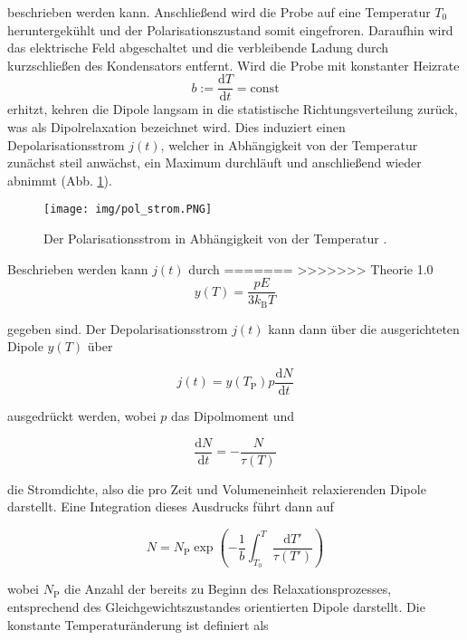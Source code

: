 beschrieben werden kann.
Anschließend wird die Probe auf eine Temperatur $T_0$ heruntergekühlt und der Polarisationszustand somit eingefroren.
Daraufhin wird das elektrische Feld abgeschaltet und die verbleibende Ladung durch kurzschließen des Kondensators entfernt.
Wird die Probe mit konstanter Heizrate
\begin{equation}
    b := \frac{\mathrm{d}T}{\mathrm{d}t} = \text{const}
\end{equation}
erhitzt, kehren die Dipole langsam in die statistische Richtungsverteilung zurück, was als Dipolrelaxation bezeichnet wird.
Dies induziert einen Depolarisationsstrom $j(t)$, welcher in Abhängigkeit von der Temperatur zunächst steil anwächst, ein Maximum durchläuft und anschließend wieder abnimmt (Abb. \ref{fig:pol_strom}).
\begin{figure}
    \centering
    \texttt{[image: img/pol\_strom.PNG]}
    \caption{Der Polarisationsstrom in Abhängigkeit von der Temperatur \cite{V48}.}
    \label{fig:pol_strom}
\end{figure}
Beschrieben werden kann $j(t)$ durch
=======
>>>>>>> Theorie 1.0
\begin{equation}
    y(T) = \frac{p E}{3 k_{\text{B}} T} 
\end{equation}

gegeben sind. Der Depolarisationsstrom $j(t)$ kann dann über die ausgerichteten 
Dipole $y(T)$ über 

\begin{equation}
    j(t) = y(T_{\mathrm{P}}) p \frac{\mathrm{d}N}{\mathrm{d}t}
\end{equation}

ausgedrückt werden, wobei $p$ das Dipolmoment und 

\begin{equation}
    \frac{\mathrm{d}N}{\mathrm{d}t} = -\frac{N}{\tau(T)}
\end{equation}

die Stromdichte, also die pro Zeit und Volumeneinheit relaxierenden Dipole darstellt.
Eine Integration dieses Ausdrucks führt dann auf 

\begin{equation*}
    N = N_{\mathrm{P}} \exp{ \left( - \frac{ 1 }{ b } \int_{T_0}^T \frac{ \mathrm{d}T' }{ \tau(T') } \right )}
\end{equation*}

wobei $N_{\text{P}}$ die Anzahl der bereits zu Beginn des Relaxationsprozesses,
entsprechend des Gleichgewichtszustandes orientierten Dipole darstellt.
Die konstante Temperaturänderung ist definiert als

